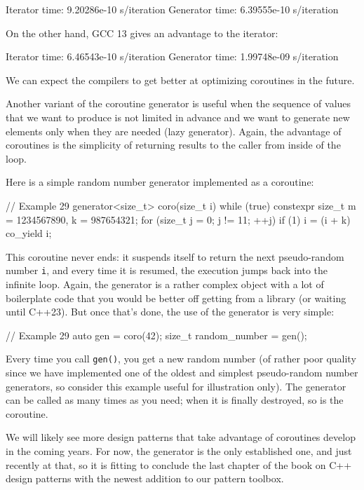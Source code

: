 \begin{code}
Iterator time: 9.20286e-10 s/iteration
Generator time: 6.39555e-10 s/iteration
\end{code}

On the other hand, GCC 13 gives an advantage to the iterator:

\begin{code}
Iterator time: 6.46543e-10 s/iteration
Generator time: 1.99748e-09 s/iteration
\end{code}

We can expect the compilers to get better at optimizing coroutines in the future.

Another variant of the coroutine generator is useful when the sequence of values that we want to produce is not limited in advance and we want to generate new elements only when they are needed (lazy generator). Again, the advantage of coroutines is the simplicity of returning results to the caller from inside of the loop.

Here is a simple random number generator implemented as a coroutine:

\begin{code}
// Example 29
generator<size_t> coro(size_t i) {
  while (true) {
    constexpr size_t m = 1234567890, k = 987654321;
    for (size_t j = 0; j != 11; ++j) {
      if (1) i = (i + k) %
    }
    co_yield i;
  }
}
\end{code}

This coroutine never ends: it suspends itself to return the next pseudo-random number \texttt{i}, and every time it is resumed, the execution jumps back into the infinite loop. Again, the generator is a rather complex object with a lot of boilerplate code that you would be better off getting from a library (or waiting until C++23). But once that's done, the use of the generator is very simple:

\begin{code}
// Example 29
auto gen = coro(42);
size_t random_number = gen();
\end{code}

Every time you call \texttt{gen()}, you get a new random number (of rather poor quality since we have implemented one of the oldest and simplest pseudo-random number generators, so consider this example useful for illustration only). The generator can be called as many times as you need; when it is finally destroyed, so is the coroutine.

We will likely see more design patterns that take advantage of coroutines develop in the coming years. For now, the generator is the only established one, and just recently at that, so it is fitting to conclude the last chapter of the book on C++ design patterns with the newest addition to our pattern toolbox.

